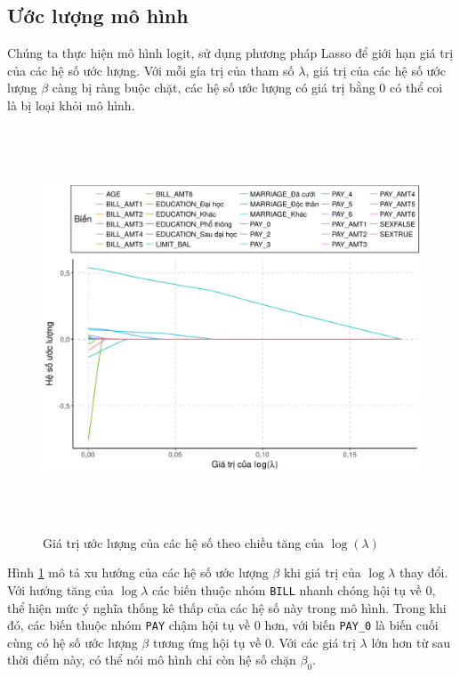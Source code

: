 \documentclass[a4paper]{report}\usepackage[]{graphicx}\usepackage[]{color}
\newenvironment{knitrout}{}{} %
\begin{document}
\subsection{Ước lượng mô hình} 


Chúng ta thực hiện mô hình logit, sử dụng phương pháp Lasso để giới hạn giá trị của các hệ số ước lượng. 
Với mỗi gía trị của tham số $\lambda$, giá trị của các hệ số ước lượng $\beta$ càng bị ràng buộc chặt, các hệ số ước lượng có giá trị bằng 0 có thể coi là bị loại khỏi mô hình.

\begin{figure}[h]
\centering
\capstart
\begin{knitrout}\small
{}\color{fgcolor}
\includegraphics[width=\textwidth,height=12cm]{Figures/lasso_coef-1} 

\end{knitrout}
\caption{Giá trị ước lượng của các hệ số theo chiều tăng của $\log(\lambda)$}
\label{fig:lasso_coef}
\end{figure}

Hình \ref{fig:lasso_coef} mô tả xu hướng của các hệ số ước lượng $\beta$ khi giá trị của $\log\lambda$ thay đổi.
Với hướng tăng của $\log\lambda$ các biến thuộc nhóm \texttt{BILL} nhanh chóng hội tụ về $0$, thể hiện mức ý nghĩa thống kê thấp của các hệ số này trong mô hình. Trong khi đó, các biến thuộc nhóm \texttt{PAY} chậm hội tụ về $0$ hơn, với biến \texttt{PAY\_0} là biến cuối cùng có hệ số ước lượng $\beta$ tương ứng hội tụ về 0.
Với các giá trị $\lambda$ lớn hơn từ sau thời điểm này, có thể nói mô hình chỉ còn hệ số chặn $\beta_0$.
\end{document}
